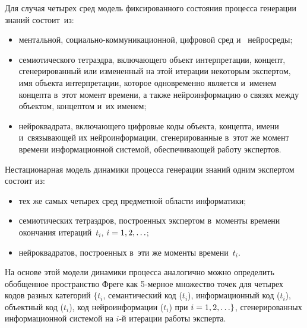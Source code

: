 {\begin{multicols}{2}
\begin{figure*}[b]
\vspace*{-3pt}

\end{figure*}
      
      Для случая четырех сред модель фиксированного состояния процесса генерации 
знаний со\-сто\-ит~из:
      \begin{itemize}
\item ментальной, со\-ци\-аль\-но-ком\-му\-ни\-ка\-ци\-он\-ной, цифровой сред и~
нейросреды;
\item семиотического тетраэдра, включающего объект интерпретации, концепт, 
сгенерированный или измененный на этой итерации некоторым экспертом, имя 
объекта интерпретации, которое одновременно является и~именем концепта 
в~этот момент времени, а также нейроинформацию о связях между объектом, 
концептом и~их именем;
\item нейроквадрата, включающего цифровые коды объекта, концепта, имени 
и~связывающей их нейроинформации, сгенерированные в~этот же момент времени 
информационной системой, обеспечивающей работу экспертов.
\end{itemize}

      Нестационарная модель динамики процесса генерации знаний одним экспертом 
состоит из:
      \begin{itemize}
\item тех же самых четырех сред предметной области информатики;
\item семиотических тетраэдров, построенных экспертом в~моменты времени 
окончания итераций~$t_i$, $i \hm= 1, 2,\ldots$;
\item нейроквадратов, построенных в~эти же моменты времени~$t_i$.
\end{itemize}

      На основе этой модели динамики процесса аналогично можно определить 
обобщенное пространство Фреге как 5-мер\-ное множество точек для четырех кодов разных 
категорий $\{t_i$, семантический код ($t_i$), информационный код ($t_i$), объектный код 
($t_i$), код нейроинформации ($t_i$) при $i \hm= 1, 2,\ldots\}$, сгенерированных 
информационной системой на $i$-й итерации работы эксперта.
      



\end{multicols}}
